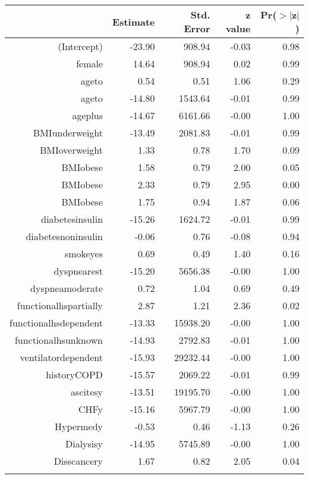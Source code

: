 \bigskip\bigskip
\centering
\begin{tabular}{rrrrr}
  \hline
 & Estimate & Std. Error & z value & Pr($>$$|$z$|$) \\ 
  \hline
(Intercept) & -23.90 & 908.94 & -0.03 & 0.98 \\ 
  female & 14.64 & 908.94 & 0.02 & 0.99 \\ 
  age\-65\-to\-74 & 0.54 & 0.51 & 1.06 & 0.29 \\ 
  age\-75\-to\-84 & -14.80 & 1543.64 & -0.01 & 0.99 \\ 
  age\-85\-plus & -14.67 & 6161.66 & -0.00 & 1.00 \\ 
  BMI\-underweight & -13.49 & 2081.83 & -0.01 & 0.99 \\ 
  BMI\-overweight & 1.33 & 0.78 & 1.70 & 0.09 \\ 
  BMI\-obese\-1 & 1.58 & 0.79 & 2.00 & 0.05 \\ 
  BMI\-obese\-2 & 2.33 & 0.79 & 2.95 & 0.00 \\ 
  BMI\-obese\-3 & 1.75 & 0.94 & 1.87 & 0.06 \\ 
  diabetes\-insulin & -15.26 & 1624.72 & -0.01 & 0.99 \\ 
  diabetes\-noninsulin & -0.06 & 0.76 & -0.08 & 0.94 \\ 
  smoke\-yes & 0.69 & 0.49 & 1.40 & 0.16 \\ 
  dyspnea\-rest & -15.20 & 5656.38 & -0.00 & 1.00 \\ 
  dyspnea\-moderate & 0.72 & 1.04 & 0.69 & 0.49 \\ 
  functional\-hs\-partially & 2.87 & 1.21 & 2.36 & 0.02 \\ 
  functional\-hs\-dependent & -13.33 & 15938.20 & -0.00 & 1.00 \\ 
  functional\-hs\-unknown & -14.93 & 2792.83 & -0.01 & 1.00 \\ 
  ventilator\-dependent & -15.93 & 29232.44 & -0.00 & 1.00 \\ 
  history\-COPD & -15.57 & 2069.22 & -0.01 & 0.99 \\ 
  ascites\-y & -13.51 & 19195.70 & -0.00 & 1.00 \\ 
  CHF\-y & -15.16 & 5967.79 & -0.00 & 1.00 \\ 
  Hyper\-med\-y & -0.53 & 0.46 & -1.13 & 0.26 \\ 
  Dialysis\-y & -14.95 & 5745.89 & -0.00 & 1.00 \\ 
  Diss\-cancer\-y & 1.67 & 0.82 & 2.05 & 0.04 \\ 
$$
\end{tabular}

